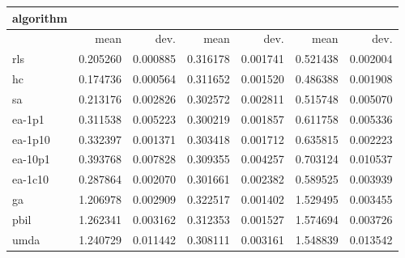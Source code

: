 \begin{tabular}{@{}l*{6}{>{{}}N{1}{2}}@{}}
\toprule
{algorithm} &  &  &  \\
\midrule
& {mean} & {dev.} & {mean} & {dev.} & {mean} & {dev.} \\
\midrule
rls & 0.205260 & 0.000885 & 0.316178 & 0.001741 & 0.521438 & 0.002004 \\
 hc & 0.174736 & 0.000564 & 0.311652 & 0.001520 & 0.486388 & 0.001908 \\
 sa & 0.213176 & 0.002826 & 0.302572 & 0.002811 & 0.515748 & 0.005070 \\
 ea-1p1 & 0.311538 & 0.005223 & 0.300219 & 0.001857 & 0.611758 & 0.005336 \\
 ea-1p10 & 0.332397 & 0.001371 & 0.303418 & 0.001712 & 0.635815 & 0.002223 \\
 ea-10p1 & 0.393768 & 0.007828 & 0.309355 & 0.004257 & 0.703124 & 0.010537 \\
 ea-1c10 & 0.287864 & 0.002070 & 0.301661 & 0.002382 & 0.589525 & 0.003939 \\
 ga & 1.206978 & 0.002909 & 0.322517 & 0.001402 & 1.529495 & 0.003455 \\
 pbil & 1.262341 & 0.003162 & 0.312353 & 0.001527 & 1.574694 & 0.003726 \\
 umda & 1.240729 & 0.011442 & 0.308111 & 0.003161 & 1.548839 & 0.013542 \\
 \bottomrule
\end{tabular}
